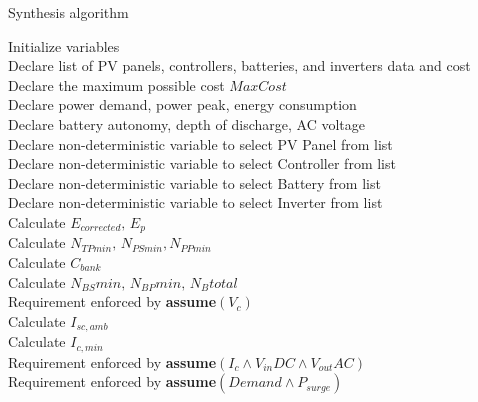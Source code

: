 \documentclass[runningheads]{llncs}
\begin{document}
 \begin{algorithm}
 \caption{Synthesis algorithm}
 \begin{algorithmic}[1]
 \begin{scriptsize}
 \renewcommand{\algorithmicrequire}{\textbf{Input:}}
 \renewcommand{\algorithmicensure}{\textbf{Output:}}
  \STATE Initialize variables \\
  \STATE Declare list of PV panels, controllers, batteries, and inverters data and cost \\
  \STATE Declare the maximum possible cost $MaxCost$  \\
  \STATE Declare power demand, power peak, energy consumption \\
  \STATE Declare battery autonomy, depth of discharge, AC voltage \\
 	\STATE Declare non-deterministic variable to select PV Panel from list \\
 	\STATE Declare non-deterministic variable to select Controller from list \\
 	\STATE Declare non-deterministic variable to select Battery from list \\
 	\STATE Declare non-deterministic variable to select Inverter from list \\ 	
 	\STATE Calculate $E_{corrected}, \, E_{p} $ \\
	\STATE Calculate $N_{TPmin}, \, N_{PSmin}, N_{PPmin} $ \\
 	\STATE Calculate $C_{bank}$ \\
	\STATE Calculate $N_{BS}min, \, N_{BP}min, \, N_{B}total$ \\
	\STATE Requirement enforced by \textbf{assume}$(V_{c})$ \\
 	\STATE Calculate $I_{sc,amb}$ \\
 	\STATE Calculate $I_{c,min}$ \\
 	\STATE Requirement enforced by \textbf{assume}$(I_{c} \wedge V_{in}DC \wedge V_{out}AC)$ \\
	\STATE Requirement enforced by \textbf{assume}$(Demand \wedge P_{surge})$ \\

\end{scriptsize}
\end{algorithmic}
\end{algorithm}
\end{document}
